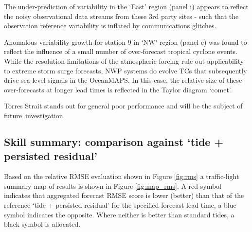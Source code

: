 The under-prediction of variability in the `East' region (panel i) appears to reflect the noisy observational data streams from these 3rd party sites - such that the observation reference variability is inflated by communications glitches.

Anomalous variability growth for station 9 in `NW' region (panel c) was found to reflect the influence of a small number of over-forecast tropical cyclone events.  While the resolution limitations of the atmospheric forcing rule out applicability to extreme storm surge forecasts, NWP systems do evolve TCs that subsequently drive sea level signals in the OceanMAPS. In this case, the relative size of these over-forecasts at longer lead times is reflected in the Taylor diagram `comet'.

Torres Strait stands out for general poor performance and will be the subject of future~investigation.



\subsection{Skill summary: comparison against `tide + persisted residual'}
Based on the relative RMSE evaluation shown in Figure \ref{fig:rms} a traffic-light summary map of results is shown in Figure \ref{fig:map_rms}.
A red symbol indicates that aggregated forecast RMSE score is lower (better) than that of the reference `tide + persisted residual' for the specified forecast lead time, a blue symbol indicates the opposite.  Where neither is better than standard tides, a black symbol is allocated.   

